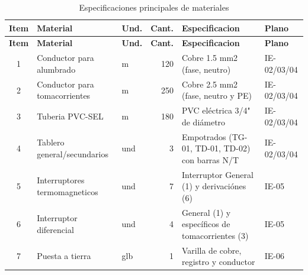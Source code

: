 \begin{landscape}
{\scriptsize
\setlength{\tabcolsep}{3pt}
\begin{longtable}{c L{3.0cm}L{1.0cm}r L{3.4cm}L{1.4cm}}
\caption{Especificaciones principales de materiales}\label{tab:especificaciones-materiales}\\
\toprule
\textbf{Item} & \textbf{Material} & \textbf{Und.} & \textbf{Cant.} & \textbf{Especificacion} & \textbf{Plano} \\
\midrule
\endfirsthead
\toprule
\textbf{Item} & \textbf{Material} & \textbf{Und.} & \textbf{Cant.} & \textbf{Especificacion} & \textbf{Plano} \\
\midrule
{} & Conductor para alumbrado & m & 120 & Cobre 1.5 mm2 (fase, neutro) & IE-02/03/04 \\
2 & Conductor para tomacorrientes & m & 250 & Cobre 2.5 mm2 (fase, neutro y PE) & IE-02/03/04 \\
3 & Tuberia PVC-SEL & m & 180 & PVC eléctrica 3/4" de diámetro & IE-02/03/04 \\
4 & Tablero general/secundarios & und & 3 & Empotrados (TG-01, TD-01, TD-02) con barras N/T & IE-02/03/04 \\
5 & Interruptores termomagneticos & und & 7 & Interruptor General (1) y derivaciónes (6) & IE-05 \\
6 & Interruptor diferencial & und & 4 & General (1) y específicos de tomacorrientes (3) & IE-05 \\
7 & Puesta a tierra & glb & 1 & Varilla de cobre, registro y conductor & IE-06 \\
\bottomrule
\end{longtable}
}
\end{landscape}
